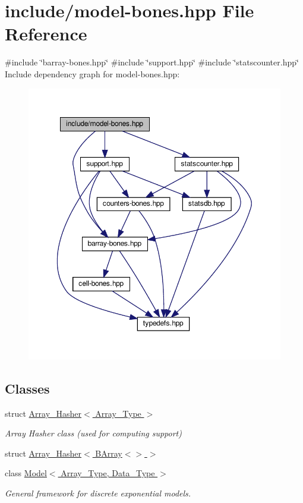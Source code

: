 \hypertarget{model-bones_8hpp}{}\section{include/model-\/bones.hpp File Reference}
\label{model-bones_8hpp}
{\ttfamily \#include \char`\"{}barray-\/bones.\+hpp\char`\"{}}\newline
{\ttfamily \#include \char`\"{}support.\+hpp\char`\"{}}\newline
{\ttfamily \#include \char`\"{}statscounter.\+hpp\char`\"{}}\newline
Include dependency graph for model-\/bones.hpp\+:
\nopagebreak
\begin{figure}[H]
\begin{center}
\leavevmode
\includegraphics[width=350pt]{model-bones_8hpp__incl}
\end{center}
\end{figure}
\subsection*{Classes}
\begin{DoxyCompactItemize}
\item 
struct \hyperlink{struct_array___hasher}{Array\+\_\+\+Hasher$<$ Array\+\_\+\+Type $>$}
\begin{DoxyCompactList}\small\item\em Array Hasher class (used for computing support) \end{DoxyCompactList}\item 
struct \hyperlink{struct_array___hasher_3_01_b_array_3_4_01_4}{Array\+\_\+\+Hasher$<$ B\+Array$<$$>$ $>$}
\item 
class \hyperlink{class_model}{Model$<$ Array\+\_\+\+Type, Data\+\_\+\+Type $>$}
\begin{DoxyCompactList}\small\item\em General framework for discrete exponential models. \end{DoxyCompactList}\end{DoxyCompactItemize}
